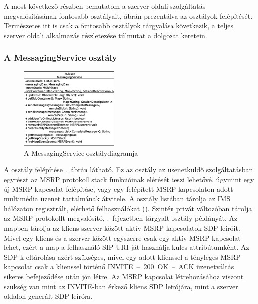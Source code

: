 A most következő részben bemutatom a szerver oldali szolgáltatás megvalósításának fontosabb osztályait, ábrán prezentálva az osztályok felépítését. Természetes itt is csak a fontosabb osztályok tárgyalása következik, a teljes szerver oldali alkalmazás részletezése túlmutat a dolgozat keretein.

\subsubsection*{A MessagingService osztály}
\label{sec:server_messagingservice}

\begin{figure}
  \vspace{-15pt}
  \begin{center}
    \includegraphics[width=0.43\textwidth]{img/class_diagrams/server/eps/MessagingService.eps}
  \end{center}
  \vspace{-15pt}
  \captionsetup{font=scriptsize}
  \caption{A MessagingService osztálydiagramja}
   \label{fig:class_server_messagingservice}
  \vspace{-10pt}
\end{figure}

A  osztály felépítése .~ábrán látható. Ez az osztály az üzenetküldő szolgáltatásban egyrészt az MSRP protokoll stack funkcióinak elérését teszi lehetővé, úgymint egy új MSRP kapcsolat felépítése, vagy egy felépített MSRP kapcsolaton adott multimédia üzenet tartalmának átvitele. A  osztály listában tárolja az IMS hálózaton regisztrált, elérhető felhasználókat (). Szintén privát változóban tárolja az MSRP protokollt megvalósító, .~fejezetben tárgyalt  osztály példányát. Az  mapben tárolja az kliens-szerver között aktív MSRP kapcsolatok SDP leíróit. Mivel egy kliens és a szerver között egyszerre csak egy aktív MSRP kapcsolat lehet, ezért a map a felhasználó SIP URI-ját használja kulcs attribútumként. Az SDP-k eltárolása azért szükséges, mivel egy adott klienssel a tényleges MSRP kapcsolat csak a klienssel történő INVITE~--~200~OK~--~ACK üzenetváltás sikeres befejeződése után jön létre. Az MSRP kapcsolat létrehozásához viszont szükség van mint az INVITE-ban érkező kliens SDP leírójára, mint a szerver oldalon generált SDP leíróra.

